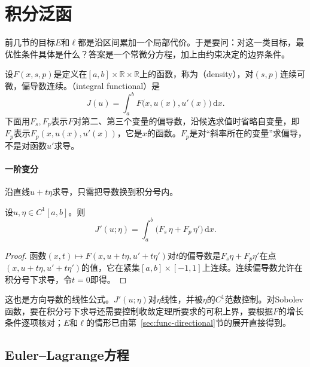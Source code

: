 \section{积分泛函}
\label{sec:func-integral}

前几节的目标$E$和$\ell$都是沿区间累加一个局部代价。于是要问：对这一类目标，最优性条件具体是什么？答案是一个常微分方程，加上由约束决定的边界条件。

设$F(x,s,p)$是定义在$[a,b]\times\mathbb{R}\times\mathbb{R}$上的函数，称为（density），对$(s,p)$连续可微，偏导数连续。（integral functional）是
\begin{equation}
 J(u)=\int_a^bF\bigl(x,u(x),u'(x)\bigr)\,\mathrm{d}x.
 \label{eq:func-integral}
\end{equation}
下面用$F_s,F_p$表示$F$对第二、第三个变量的偏导数，沿候选求值时省略自变量，即$F_p$表示$F_p(x,u(x),u'(x))$，它是$x$的函数。$F_p$是对“斜率所在的变量”求偏导，不是对函数$u'$求导。

\paragraph{一阶变分}
沿直线$u+t\eta$求导，只需把导数换到积分号内。

\begin{theorem}[积分泛函的一阶变分]
\label{thm:func-first-variation}
设$u,\eta\in C^1[a,b]$。则
\begin{equation}
 J'(u;\eta)=\int_a^b\bigl(F_s\,\eta+F_p\,\eta'\bigr)\,\mathrm{d}x.
 \label{eq:func-first-variation}
\end{equation}
\end{theorem}

\begin{proof}
函数$(x,t)\mapsto F(x,u+t\eta,u'+t\eta')$对$t$的偏导数是$F_s\eta+F_p\eta'$在点$(x,u+t\eta,u'+t\eta')$的值，它在紧集$[a,b]\times[-1,1]$上连续。连续偏导数允许在积分号下求导，令$t=0$即得。
\end{proof}

这也是方向导数的线性公式。$J'(u;\eta)$对$\eta$线性，并被$\eta$的$C^1$范数控制。对Sobolev函数，要在积分号下求导还需要控制收敛定理所要求的可积上界，要根据$F$的增长条件逐项核对；$E$和$\ell$的情形已由第~\ref{sec:func-directional}节的展开直接得到。

\subsection{Euler--Lagrange方程}
\label{sec:func-euler-lagrange}

